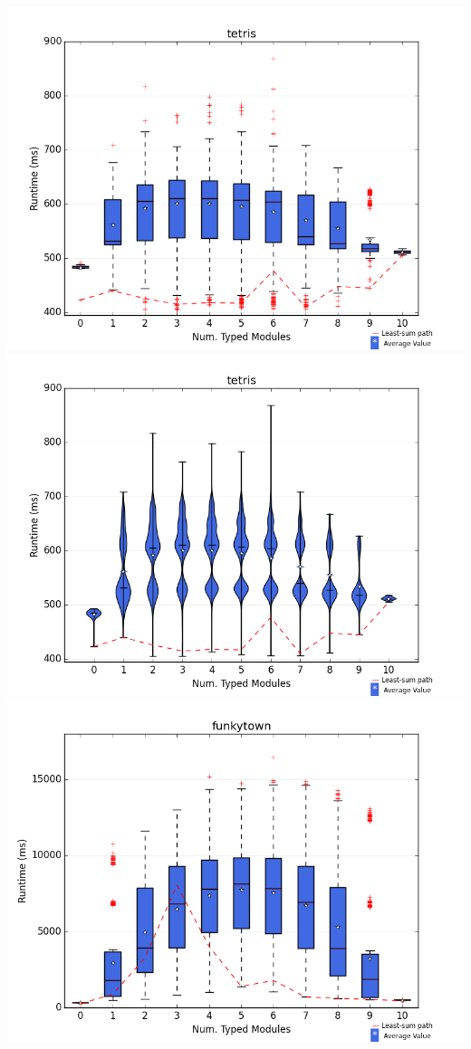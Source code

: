 \documentclass{article}
\begin{document}
\newpage
\includegraphics[width=\textwidth]{boxplots/tetris-boxplot.png}
\includegraphics[width=\textwidth]{violins/tetris-violin.png}
\newpage
\includegraphics[width=\textwidth]{boxplots/funkytown-boxplot.png}
\end{document}
